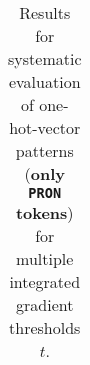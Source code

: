 \begin{table}[t]
\begin{tabular}{lllllll}

\\ \hline
\end{tabular}
\caption[Model Evaluation for only \texttt{PRON} tokens]{Results for systematic evaluation of one-hot-vector patterns (\textbf{only \texttt{PRON} tokens}) for multiple integrated gradient thresholds $t$.}
\label{tab:evalResultsPRON}
\end{table}
	
